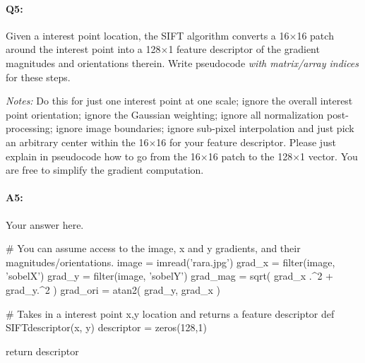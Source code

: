 \pagebreak
\paragraph{Q5:} Given a interest point location, the SIFT algorithm converts a 16$\times$16 patch around the interest point into a 128$\times$1 feature descriptor of the gradient magnitudes and orientations therein. Write pseudocode \emph{with matrix/array indices} for these steps.

\emph{Notes:} Do this for just one interest point at one scale; ignore the overall interest point orientation; ignore the Gaussian weighting; ignore all normalization post-processing; ignore image boundaries; ignore sub-pixel interpolation and just pick an arbitrary center within the 16$\times$16 for your feature descriptor. Please just explain in pseudocode how to go from the 16$\times$16 patch to the 128$\times$1 vector. You are free to simplify the gradient computation.

\paragraph{A5:} Your answer here.


\begin{python}
# You can assume access to the image, x and y gradients, and their magnitudes/orientations.
image = imread('rara.jpg')
grad_x = filter(image, 'sobelX')
grad_y = filter(image, 'sobelY')
grad_mag = sqrt( grad_x .^2 + grad_y.^2 )
grad_ori = atan2( grad_y, grad_x )

# Takes in a interest point x,y location and returns a feature descriptor
def SIFTdescriptor(x, y)
    descriptor = zeros(128,1)

    return descriptor
\end{python}




%
%



